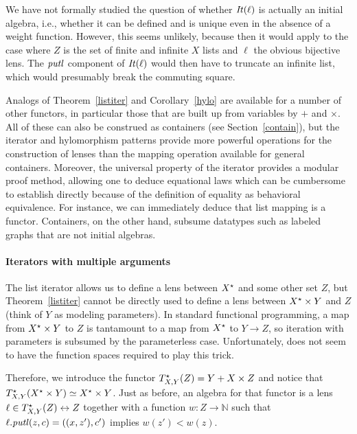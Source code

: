 \begin{defn}[$R$-similarity]
\begin{theorem}
\begin{lemma}
\begin{theorem}[No products]
\begin{lemma}
\begin{defn}
\begin{theorem}
\begin{corollary}[Hylomorphism]
We have not formally studied the question of whether $\mathit{It}(\ell)$
is actually an initial algebra, i.e., whether it can
be defined and is unique even in the absence of a weight function. However,
this seems unlikely, because then it would apply to the case where $Z$ is the
set of finite and infinite $X$ lists and $\ell$ the obvious bijective lens.
The $\mathit{putl}$ component of $\mathit{It}(\ell)$ would then have to truncate an infinite
list, which would presumably break the commuting square.

Analogs of Theorem~\ref{listiter} and
Corollary~\ref{hylo} are available for a number of other functors, in
particular those that are built up from variables by $+$ and $\times$.
All of these can also be construed as containers (see
Section~\ref{contain}), but the iterator and hylomorphism patterns
provide more powerful operations for the construction of lenses than
the mapping operation available for general containers. Moreover, the
universal property of the iterator provides a modular proof method,
allowing one to deduce equational laws which can be cumbersome to
establish directly because of the definition of equality as behavioral
equivalence. For instance, we can immediately deduce that list mapping
is a functor. Containers, on the other hand, subsume datatypes such as labeled graphs that are not initial algebras. 

\paragraph{Iterators with multiple arguments}
The list iterator allows us to define a lens between $X^\star$ and some
other set $Z$, but Theorem~\ref{listiter} cannot be directly used to define
a lens between $X^\star \times Y$ and $Z$ (think of $Y$ as modeling
parameters).  In standard functional programming, a
map from $X^\star\times Y$ to $Z$ is tantamount to a map from $X^\star$
to $Y{\rightarrow}Z$, so iteration with parameters is subsumed by
the parameterless case. Unfortunately, \LENS{} does not seem to have the
function spaces required to play this trick.

Therefore, we introduce the functor $T^\star_{X,Y}(Z)=Y + X \times
Z$ and notice that $T^\star_{X,Y}(X^\star \times Y)\simeq X^\star \times
Y$. Just as before, 
an algebra for that functor is a lens $\ell \in T^\star_{X,Y}(Z)\leftrightarrow Z$ together with a function $w:Z\rightarrow \mathbb{N}$ such that 
$\ell.\mathit{putl}(z,c) = ((x,z'),c')$ implies $w(z')<w(z)$.


\end{corollary}
\end{theorem}
\end{defn}
\end{lemma}
\end{theorem}
\end{lemma}
\end{theorem}
\end{defn}
